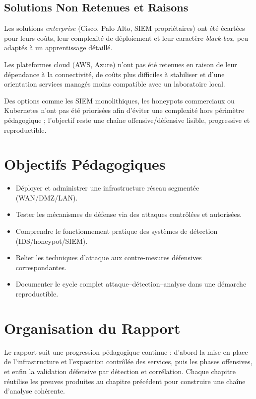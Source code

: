 \documentclass[12pt,a4paper,openany]{report}
\begin{document}
	
	\subsection{Solutions Non Retenues et Raisons}
	
	Les solutions \textit{enterprise} (Cisco, Palo Alto, SIEM propriétaires) ont été écartées pour leurs coûts, leur complexité de déploiement et leur caractère \textit{black-box}, peu adaptés à un apprentissage détaillé.
	
	Les plateformes cloud (AWS, Azure) n'ont pas été retenues en raison de leur dépendance à la connectivité, de coûts plus difficiles à stabiliser et d'une orientation services managés moins compatible avec un laboratoire local.
	
	Des options comme les SIEM monolithiques, les honeypots commerciaux ou Kubernetes n'ont pas été priorisées afin d'éviter une complexité hors périmètre pédagogique ; l'objectif reste une chaîne offensive/défensive lisible, progressive et reproductible.
	
	\section{Objectifs Pédagogiques}
	
	\begin{itemize}
		\item Déployer et administrer une infrastructure réseau segmentée (WAN/DMZ/LAN).
		\item Tester les mécanismes de défense via des attaques contrôlées et autorisées.
		\item Comprendre le fonctionnement pratique des systèmes de détection (IDS/honeypot/SIEM).
		\item Relier les techniques d'attaque aux contre-mesures défensives correspondantes.
		\item Documenter le cycle complet attaque--détection--analyse dans une démarche reproductible.
	\end{itemize}
	
	\section{Organisation du Rapport}
	
	Le rapport suit une progression pédagogique continue : d'abord la mise en place de l'infrastructure et l'exposition contrôlée des services, puis les phases offensives, et enfin la validation défensive par détection et corrélation. Chaque chapitre réutilise les preuves produites au chapitre précédent pour construire une chaîne d'analyse cohérente.
	
\end{document}
